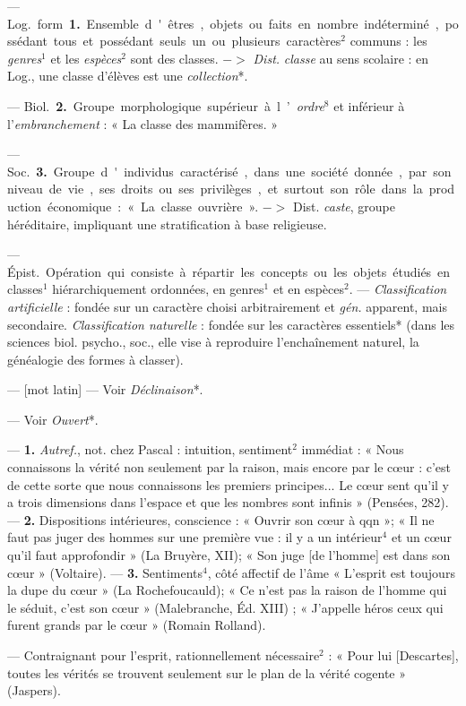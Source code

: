 \begin{itemize}[leftmargin=1cm, label=, itemsep=11pt]
 — \si{Log.} form. {\bf 1.} Ensemble
d'êtres, objets ou faits en nombre
indéterminé, possédant tous et possédant seuls un ou plusieurs caractères$^2$ communs : les {\it genres}$^1$ et les
{\it espèces}$^2$ sont des classes. $->$ {\it Dist.}
{\it classe} au sens scolaire : en Log., une
classe d’élèves est une {\it collection}*.

— \si{Biol.} {\bf 2.} Groupe morphologique supérieur à l’{\it ordre}$^8$ et inférieur à l’{\it embranchement} : « La classe
des mammifères. »

— \si{Soc.} {\bf 3.} Groupe d'individus
caractérisé, dans une société donnée,
par son niveau de vie, ses droits ou
ses privilèges, et surtout son rôle
dans la production économique :
« La classe ouvrière ». $->$ Dist.
{\it caste}, groupe héréditaire, impliquant
une stratification à base religieuse.

 — \si{Épist.} Opération qui
consiste à répartir les concepts ou
les objets étudiés en classes$^1$ hiérarchiquement ordonnées, en genres$^1$
et en espèces$^2$. — {\it Classification artificielle} : fondée sur un caractère
choisi arbitrairement et  {\it gén.} apparent, mais secondaire. {\it Classification
naturelle} : fondée sur les caractères
essentiels* (dans les sciences biol.
psycho., soc., elle vise à reproduire
l’enchaînement naturel, la généalogie des formes à classer).

 — [mot latin] — Voir {\it Déclinaison}*.

 — Voir {\it Ouvert}*.

 — {\bf 1.} {\it Autref.}, not. chez Pascal :
intuition, sentiment$^2$ immédiat :
« Nous connaissons la vérité non
seulement par la raison, mais encore
par le cœur : c’est de cette sorte que
nous connaissons les premiers principes... Le cœur sent qu’il y a trois
dimensions dans l’espace et que les
nombres sont infinis » (Pensées, 282).
— {\bf 2.} Dispositions intérieures, conscience : « Ouvrir son cœur à qqn »;
« Il ne faut pas juger des hommes
sur une première vue : il y a un
intérieur$^4$ et un cœur qu'il faut
approfondir » (La Bruyère, XII);
« Son juge [de l'homme] est dans
son cœur » (Voltaire). — {\bf 3.} Sentiments$^4$, côté affectif de l'âme
« L'esprit est toujours la dupe du
cœur » (La Rochefoucauld); « Ce
n'est pas la raison de l’homme qui
le séduit, c’est son cœur » (Malebranche, Éd. XIII) ; « J’appelle héros
ceux qui furent grands par le cœur »
(Romain Rolland).

 — Contraignant pour l'esprit,
rationnellement nécessaire$^2$ : « Pour
lui [Descartes], toutes les vérités se
trouvent seulement sur le plan de la
vérité cogente » (Jaspers).
%


\end{itemize}
